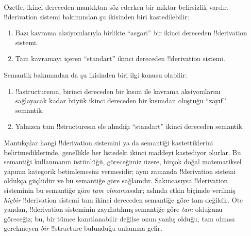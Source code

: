 Özetle, ikinci dereceden mantıktan söz ederken bir miktar belirsizlik vardır.
!!{derivation} sistemi bakımından şu ikisinden biri kastedilebilir:
\begin{enumerate}
\item Bazı kavrama aksiyomlarıyla birlikte ``asgari'' bir ikinci dereceden
  !!{derivation} sistemi.
\item Tam kavramayı içeren ``standart'' ikinci dereceden !!{derivation}
  sistemi.
\end{enumerate}
Semantik bakımından da şu ikisinden biri ilgi konusu olabilir:
\begin{enumerate}
\item !!a{structure}{}nın, birinci dereceden bir kısım ile kavrama aksiyomlarını
  sağlayacak kadar büyük ikinci dereceden bir kısımdan oluştuğu ``zayıf''
  semantik.
\item Yalnızca tam !!{structure}s{}ın ele alındığı ``standart'' ikinci dereceden
  semantik.
\end{enumerate}
Mantıkçılar hangi !!{derivation} sistemini ya da semantiği kastettiklerini
belirtmediklerinde, genellikle her listedeki ikinci maddeyi kastediyor olurlar.
Bu semantiği kullanmanın üstünlüğü, göreceğimiz üzere, birçok doğal matematiksel
yapının kategorik betimlemesini vermesidir; aynı zamanda !!{derivation} sistemi
oldukça güçlüdür ve bu semantiğe göre sağlamdır. Sakıncasıysa !!{derivation}
sisteminin bu semantiğe göre \emph{tam olmaması}dır; aslında etkin biçimde
verilmiş \emph{hiçbir} !!{derivation} sistemi tam ikinci dereceden semantiğe
göre tam değildir. Öte yandan, !!{derivation} sisteminin zayıflatılmış
semantiğe göre \emph{tam} olduğunu göreceğiz; bu, bir tümce kanıtlanabilir
değilse onun yanlış olduğu, tam olması gerekmeyen \emph{bir} !!{structure}
bulunduğu anlamına gelir.

